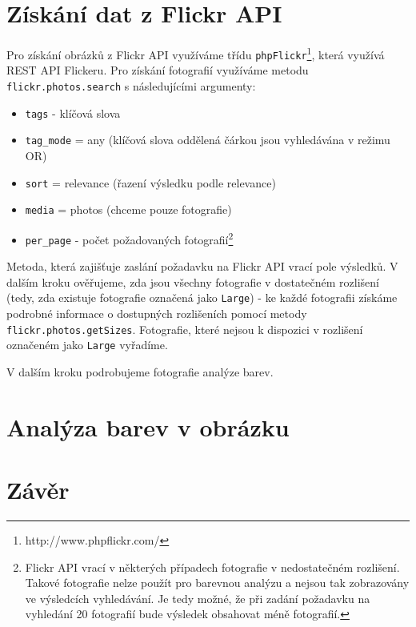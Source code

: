 \documentclass[12pt]{article}
\begin{document}
\section{Získání dat z Flickr API}
Pro získání obrázků z Flickr API využíváme třídu \texttt{phpFlickr}\footnote{http://www.phpflickr.com/}, která využívá REST API Flickeru. Pro získání fotografií využíváme metodu \texttt{flickr.photos.search} s následujícími argumenty:
\begin{itemize}
\item \texttt{tags} - klíčová slova
\item \texttt{tag\_mode} = any (klíčová slova oddělená čárkou jsou vyhledávána v režimu OR)
\item \texttt{sort} = relevance (řazení výsledku podle relevance)
\item \texttt{media} = photos (chceme pouze fotografie)
\item \texttt{per\_page} - počet požadovaných fotografií\footnote{Flickr API vrací v některých případech fotografie v nedostatečném rozlišení. Takové fotografie nelze použít pro barevnou analýzu a nejsou tak zobrazovány ve výsledcích vyhledávání. Je tedy možné, že při zadání požadavku na vyhledání 20 fotografií bude výsledek obsahovat méně fotografií.}
\end{itemize}

Metoda, která zajišťuje zaslání požadavku na Flickr API vrací pole výsledků. V dalším kroku ověřujeme, zda jsou všechny fotografie v dostatečném rozlišení (tedy, zda existuje fotografie označená jako \texttt{Large}) - ke každé fotografii získáme podrobné informace o dostupných rozlišeních pomocí metody \texttt{flickr.photos.getSizes}. Fotografie, které nejsou k dispozici v rozlišení označeném jako \texttt{Large} vyřadíme.

V dalším kroku podrobujeme fotografie analýze barev.

\section{Analýza barev v obrázku}

\section{Závěr}
\end{document}
